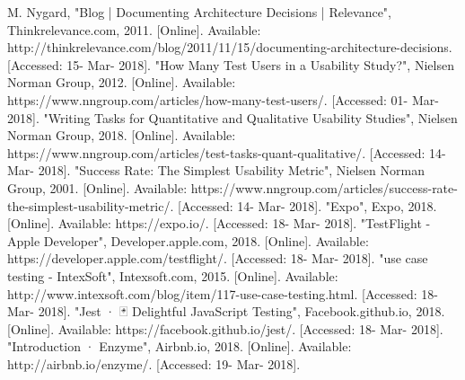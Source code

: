 \documentclass[12pt,a4paper]{article}
\begin{document}
    \begin{thebibliography}{20}
       M. Nygard, "Blog | Documenting Architecture Decisions | Relevance", Thinkrelevance.com, 2011. [Online]. Available: http://thinkrelevance.com/blog/2011/11/15/documenting-architecture-decisions. [Accessed: 15- Mar- 2018].
       "How Many Test Users in a Usability Study?", Nielsen Norman Group, 2012. [Online]. Available: https://www.nngroup.com/articles/how-many-test-users/. [Accessed: 01- Mar- 2018].
       "Writing Tasks for Quantitative and Qualitative Usability Studies", Nielsen Norman Group, 2018. [Online]. Available: https://www.nngroup.com/articles/test-tasks-quant-qualitative/. [Accessed: 14- Mar- 2018].
       "Success Rate: The Simplest Usability Metric", Nielsen Norman Group, 2001. [Online]. Available: https://www.nngroup.com/articles/success-rate-the-simplest-usability-metric/. [Accessed: 14- Mar- 2018].
       "Expo", Expo, 2018. [Online]. Available: https://expo.io/. [Accessed: 18- Mar- 2018].
       "TestFlight - Apple Developer", Developer.apple.com, 2018. [Online]. Available: https://developer.apple.com/testflight/. [Accessed: 18- Mar- 2018].
       "use case testing - IntexSoft", Intexsoft.com, 2015. [Online]. Available: http://www.intexsoft.com/blog/item/117-use-case-testing.html. [Accessed: 18- Mar- 2018].
       "Jest · 🃏 Delightful JavaScript Testing", Facebook.github.io, 2018. [Online]. Available: https://facebook.github.io/jest/. [Accessed: 18- Mar- 2018].
       "Introduction · Enzyme", Airbnb.io, 2018. [Online]. Available: http://airbnb.io/enzyme/. [Accessed: 19- Mar- 2018].
    \end{thebibliography}
    
\end{document}
